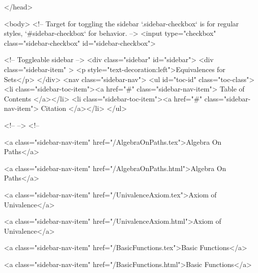   
</head>




  <body>
    <!-- Target for toggling the sidebar `.sidebar-checkbox` is for regular
     styles, `#sidebar-checkbox` for behavior. -->
<input type="checkbox" class="sidebar-checkbox" id="sidebar-checkbox">

<!-- Toggleable sidebar -->
<div class="sidebar" id="sidebar">
  <div class="sidebar-item" >
    <p style="text-decoration:left">Equivalences for Sets</p>
  </div>
  <nav class="sidebar-nav">
    <ul id="toc-id" class="toc-class">
  <li class="sidebar-toc-item"><a href="#" class="sidebar-nav-item"> Table of Contents </a></li>
  <li class="sidebar-toc-item"><a href="#" class="sidebar-nav-item"> Citation </a></li>
</ul>


    <!--  -->
    <!-- 
      
    
      
    
      
    
      
        
      
    
      
        
          <a class="sidebar-nav-item" href="/AlgebraOnPaths.tex">Algebra On Paths</a>
        
      
    
      
        
          <a class="sidebar-nav-item" href="/AlgebraOnPaths.html">Algebra On Paths</a>
        
      
    
      
        
          <a class="sidebar-nav-item" href="/UnivalenceAxiom.tex">Axiom of Univalence</a>
        
      
    
      
        
          <a class="sidebar-nav-item" href="/UnivalenceAxiom.html">Axiom of Univalence</a>
        
      
    
      
        
          <a class="sidebar-nav-item" href="/BasicFunctions.tex">Basic Functions</a>
        
      
    
      
        
          <a class="sidebar-nav-item" href="/BasicFunctions.html">Basic Functions</a>
        
      
    
      
        
